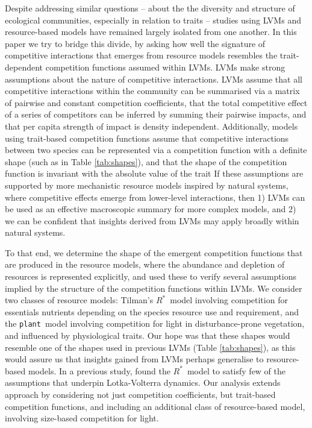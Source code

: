 \documentclass[a4paper,11pt]{article}
\newcommand{\Rstar}{\ensuremath{R^*}}
\newcommand{\plant}{{\tt plant}}
\begin{document}
Despite addressing similar questions -- about the the diversity and
structure of ecological communities, especially in relation to traits
-- studies using LVMs and resource-based models have remained largely
isolated from one another. In this paper we try to bridge this divide,
by asking how well the signature of competitive interactions that
emerges from resource models resembles the trait-dependent competition
functions assumed within LVMs. LVMs make strong assumptions about the
nature of competitive interactions. LVMs assume that all competitive
interactions within the community can be summarised via a matrix of
pairwise and constant competition coefficients, that the total
competitive effect of a series of competitors can be inferred by
summing their pairwise impacts, and that per capita strength of impact
is density independent. Additionally, models using trait-based
competition functions assume that competitive interactions between two
species can be represented via a competition function with a definite
shape (such as in Table \ref{tab:shapes}), and that the shape of the
competition function is invariant with the absolute value of the trait
If these assumptions are supported by more mechanistic resource
models inspired by natural systems, where competitive effects emerge from lower-level interactions, then 1) LVMs can be used as an effective macroscopic summary for more complex models, and 2) we can be confident that insights derived from LVMs may apply broadly within natural systems. 

To that end, we determine the shape of the emergent competition
functions that are produced in the resource models, where the
abundance and depletion of resources is represented explicitly, and
used these to verify several assumptions implied by the structure of
the competition functions within LVMs. We consider two classes of
resource models: Tilman's \Rstar\ model involving competition for
essentials nutrients depending on the species resource use and
requirement, and the \plant\ model involving competition for light in
disturbance-prone vegetation, and influenced by physiological
traits. Our hope was that these shapes would resemble one of the
shapes used in previous LVMs (Table \ref{tab:shapes}), as this would
assure us that insights gained from LVMs perhaps generalise to
resource-based models. In a previous study, \citet{Abrams-2008} found the \Rstar\ model to satisfy few of the assumptions that underpin Lotka-Volterra dynamics. Our analysis extends \citeauthor{Abrams-2008} approach by considering not just competition coefficients, but trait-based competition functions, and including an additional class of resource-based model, involving size-based competition for light.
\end{document}
